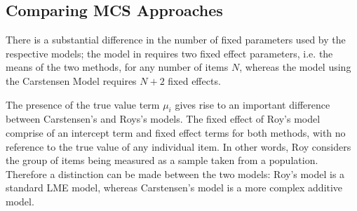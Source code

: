 \documentclass[12pt, a4paper]{report}
\theoremstyle{plain}
\theoremstyle{definition}
\theoremstyle{remark}
\begin{document}
	
	\subsection{Comparing MCS Approaches}	
%	
%	
	

	
	

There is a substantial difference in the number of fixed parameters used by the respective models; the model in \citet{ARoy2009} requires two fixed effect parameters, i.e. the means of the two methods, for any number of items $N$, whereas the model using the Carstensen Model requires $N+2$ fixed effects. 

The presence of the true value term $\mu_i$ gives rise to an important difference between Carstensen's and Roys's models. The fixed effect of Roy's model comprise of an intercept term and fixed effect terms for both methods, with no reference to the true value of any individual item. In other words, Roy considers the group of items being measured as a sample taken from a population. Therefore a distinction can be made between the two models: Roy's model is a standard LME model, whereas Carstensen's model is a more complex additive model.
	
	
\end{document}
